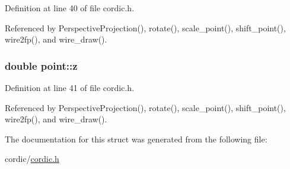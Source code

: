 Definition at line 40 of file cordic.\+h.



Referenced by Perspective\+Projection(), rotate(), scale\+\_\+point(), shift\+\_\+point(), wire2fp(), and wire\+\_\+draw().

\subsubsection[{\texorpdfstring{z}{z}}]{\setlength{\rightskip}{0pt plus 5cm}double point\+::z}\hypertarget{structpoint_aab1f0c3682401083b5bf252e7001874f}{}\label{structpoint_aab1f0c3682401083b5bf252e7001874f}


Definition at line 41 of file cordic.\+h.



Referenced by Perspective\+Projection(), rotate(), scale\+\_\+point(), shift\+\_\+point(), wire2fp(), and wire\+\_\+draw().



The documentation for this struct was generated from the following file\+:\begin{DoxyCompactItemize}
\item 
cordic/\hyperlink{cordic_8h}{cordic.\+h}\end{DoxyCompactItemize}
